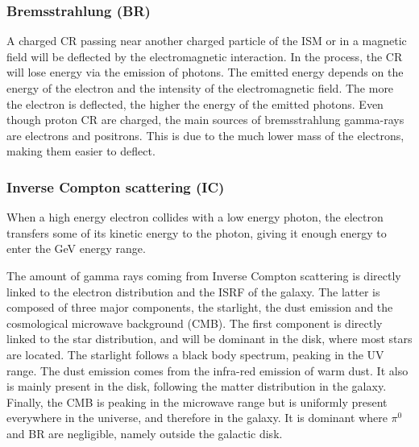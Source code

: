 \subsubsection{Bremsstrahlung (BR)}


A charged CR passing near another charged particle of the ISM or in a magnetic field will be deflected by the electromagnetic interaction. In the process, the CR will lose energy via the emission of photons. The emitted energy depends on the energy of the electron and the intensity of the electromagnetic field. The more the electron is deflected, the higher the energy of the emitted photons.
Even though proton CR are charged, the main sources of bremsstrahlung gamma-rays are electrons and positrons. This is due to the much lower mass of the electrons, making them easier to deflect. 



\subsubsection{Inverse Compton scattering (IC)}


When a high energy electron collides with a low energy photon, the electron transfers some of its kinetic energy to the photon, giving it enough energy to enter the GeV energy range.

The amount of gamma rays coming from Inverse Compton scattering is directly linked to the electron distribution and the ISRF of the galaxy. The latter is composed of three major components, the starlight, the dust emission and the cosmological microwave background (CMB). The first component is directly linked to the star distribution, and will be dominant in the disk, where most stars are located. The starlight follows a black body spectrum, peaking in the UV range. The dust emission comes from the infra-red emission of warm dust. It also is mainly present in the disk, following the matter distribution in the galaxy. Finally, the CMB is peaking in the microwave range but is uniformly present everywhere in the universe, and therefore in the galaxy. It is dominant where $\pi^{0}$ and BR are negligible, namely outside the galactic disk.



